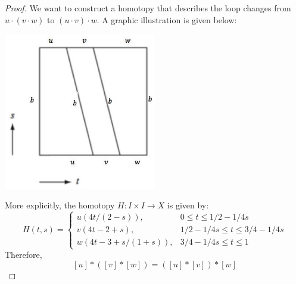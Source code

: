 \begin{proof}
We want to construct a homotopy that describes the loop changes from \(u \cdot  \left( {v \cdot  w}\right)\) to \(\left( {u \cdot  v}\right)  \cdot  w\). A graphic illustration is given below:
\begin{center}
\includegraphics[width=0.5\textwidth]{images/Ch7_associativity_pi1.jpg}
\end{center}
More explicitly, the homotopy \(H : I \times  I \rightarrow  X\) is given by:
\[
H\left( {t,s}\right)  = \left\{  \begin{matrix} u\left( {{4t}/\left( {2 - s}\right) }\right), & 0 \leq  t \leq  1/2 - 1/{4s} \\  v\left( {{4t} - 2 + s}\right), & 1/2 - 1/{4s} \leq  t \leq  3/4 - 1/{4s} \\  w\left( {{4t} - 3 + s/\left( {1 + s}\right) }\right), & 3/4 - 1/{4s} \leq  t \leq  1 \end{matrix}\right.
\]
Therefore,
\[
\left\lbrack  u\right\rbrack   * \left( {\left\lbrack  v\right\rbrack   * \left\lbrack  w\right\rbrack  }\right)  = \left( {\left\lbrack  u\right\rbrack   * \left\lbrack  v\right\rbrack  }\right)  * \left\lbrack  w\right\rbrack
\]


\end{proof}
